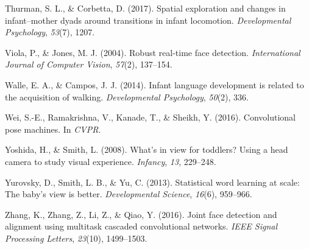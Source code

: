 \documentclass[10pt, letterpaper]{article}
\begin{document}
\hypertarget{ref-thurman2017spatial}{}
Thurman, S. L., \& Corbetta, D. (2017). Spatial exploration and changes
in infant--mother dyads around transitions in infant locomotion.
\emph{Developmental Psychology}, \emph{53}(7), 1207.

\hypertarget{ref-viola2004robust}{}
Viola, P., \& Jones, M. J. (2004). Robust real-time face detection.
\emph{International Journal of Computer Vision}, \emph{57}(2), 137--154.

\hypertarget{ref-walle2014}{}
Walle, E. A., \& Campos, J. J. (2014). Infant language development is
related to the acquisition of walking. \emph{Developmental Psychology},
\emph{50}(2), 336.

\hypertarget{ref-wei2016cpm}{}
Wei, S.-E., Ramakrishna, V., Kanade, T., \& Sheikh, Y. (2016).
Convolutional pose machines. In \emph{CVPR}.

\hypertarget{ref-yoshida2008}{}
Yoshida, H., \& Smith, L. (2008). What's in view for toddlers? Using a
head camera to study visual experience. \emph{Infancy}, \emph{13},
229--248.

\hypertarget{ref-yurovsky2013statistical}{}
Yurovsky, D., Smith, L. B., \& Yu, C. (2013). Statistical word learning
at scale: The baby's view is better. \emph{Developmental Science},
\emph{16}(6), 959--966.

\hypertarget{ref-zhang2016}{}
Zhang, K., Zhang, Z., Li, Z., \& Qiao, Y. (2016). Joint face detection
and alignment using multitask cascaded convolutional networks.
\emph{IEEE Signal Processing Letters}, \emph{23}(10), 1499--1503.
\end{document}
